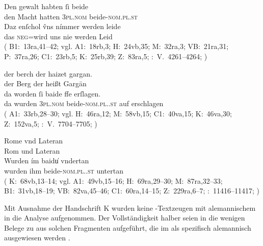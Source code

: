 \begin{exe}
\ex \label{ex:neutralpos}
	\gll Den gewalt habten ſi beide \\
		den Macht hatten \textsc{3pl\subM.nom} beide-\textsc{nom.pl\subM.st} \\
\sn \gll Daz enſchol v̂ns nímmer werden leide \\
		das \textsc{neg}=wird uns nie werden Leid \\
	\trans {}
		(%
			B1:~13ra,41--42; vgl.
			A1:~18rb,3;
			H:~24vb,35;
			M:~32ra,3;
			VB:~21ra,31;
			P:~37ra,26;
			C1:~23rb,5;
			K:~25rb,39;
			Z:~83ra,5;
			\KC:~V.~4261--4264;
			\cite[159]{schroeder1895}%
		)

\ex \label{ex:neutralpos2}
	\begin{xlist}
	\ex \label{ex:neutralpos2_1}
		\gll der berch der haizet gargan. \\
			der Berg der heißt Gargān \\
	\sn \gll da worden ſi baide ffe erſlagen. \\
			da wurden \textsc{3pl\subM.nom} beide-\textsc{nom.pl.\MascM.st} auf
				erschlagen \\
		\trans {}
			(%
				A1:~33rb,28--30; vgl.
				H:~46ra,12;
				M:~58vb,15;
				C1:~40va,15;
				K:~46va,30;
				Z:~152va,5;
				\KC:~V.~7704--7705;
				\cite[222]{schroeder1895}%
			)

	\ex \label{ex:neutralpos2_2}
		\gll Rome vnd Lateran \\
			Rom und Lateran \\
	\sn \gll Wurden ím baidu̍ vndertan \\
			wurden ihm beide-\textsc{nom.pl.\NeutI.st} untertan \\
		\trans {}
			(%
				K:~68vb,13--14; vgl.
				A1:~49vb,15--16;
				H:~69ra,29--30;
				M:~87ra,32--33;
				B1:~31vb,18--19;
				VB:~82va,45--46;
				C1:~60ra,14--15;
				Z:~229ra,6--7;
				\KC:~11416--11417;
				\cite[290]{schroeder1895}%
			)
		\\
	\end{xlist}
\end{exe}

Mit Ausnahme der Handschrift K wurden keine \KC{}-Text\-zeugen mit
alemannischem  in die Analyse aufgenommen.
Der Vollständigkeit halber seien in  die wenigen Belege zu
 aus solchen Fragmenten aufgeführt, die im
 \nosh\autocite{hsc} als spezifisch
alemannisch ausgewiesen werden \autocite[vgl.][4, 44,
54]{wolf:kckat}.


